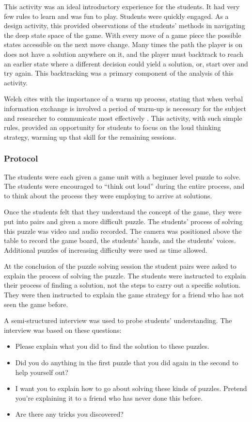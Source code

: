 	This activity was an ideal introductory experience for the students. It had very few rules to learn and was fun to play. Students were quickly engaged. As a design activity, this provided observations of the students' methods in navigating the deep state space of the game. With every move of a game piece the possible states accessible on the next move change. Many times the path the player is on does not have a solution anywhere on it, and the player must backtrack to reach an earlier state where a different decision could yield a solution, or, start over and try again. This backtracking was a primary component of the analysis of this activity.
	
	Welch cites \citeauthor{ericsson-1984} with the importance of a warm up process, stating that when verbal information exchange is involved a period of warm-up is necessary for the subject and researcher to communicate most effectively \citeyearpar{ericsson-1984}. This activity, with such simple rules, provided an opportunity for students to focus on the loud thinking strategy, warming up that skill for the remaining sessions.
	
	\subsubsection{Protocol}
	
	The students were each given a game unit with a beginner level puzzle to solve.  The students were encouraged to {}``think out loud'' during the entire process, and to think about the process they were employing to arrive at solutions.
	
	Once the students felt that they understand the concept of the game, they were put into pairs and given a more difficult puzzle. The students\textquoteright{} process of solving this puzzle was video and audio recorded. The camera was positioned above the table to record the game board, the students\textquoteright{} hands,
	and the students\textquoteright{} voices. Additional puzzles of increasing difficulty were used as time allowed.
	
	At the conclusion of the puzzle solving session the student pairs were asked to explain the process of solving the puzzle. The students were instructed to explain their process of finding a solution, not the steps to carry out a specific solution. They were then instructed to explain the game strategy for a friend who has not seen the game before.
	
	A semi-structured interview was used to probe students\textquoteright{} understanding. The interview was based on these questions:
	\begin{itemize}
	\item Please explain what you did to find the solution to these puzzles. 
	\item Did you do anything in the first puzzle that you did again in the
	second to help yourself out? 
	\item I want you to explain how to go about solving these kinds of puzzles.
	Pretend you\textquoteright{}re explaining it to a friend who has never
	done this before. 
	\item Are there any tricks you discovered? 
	\end{itemize}
	
